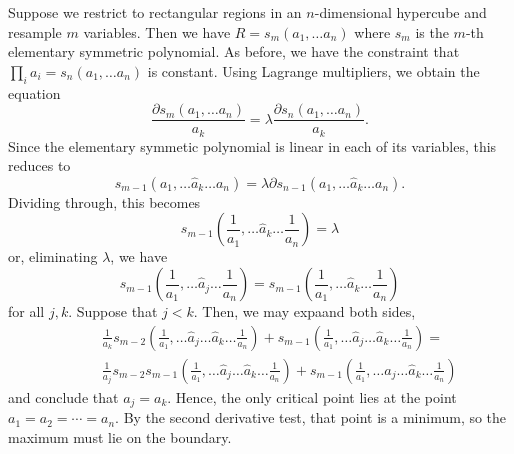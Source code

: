 Suppose we restrict to rectangular regions in an $n$-dimensional hypercube and resample $m$ variables.  Then we have $R = s_m (a_1, \ldots a_n)$ where $s_m$ is the $m$-th elementary symmetric polynomial.  As before, we have the constraint that $\prod_i a_i = s_n (a_1, \ldots a_n)$ is constant.  Using Lagrange multipliers, we obtain the equation
\[
\frac{\partial s_m (a_1, \ldots a_n)}{a_k} = \lambda \frac{\partial s_n (a_1, \ldots a_n)}{a_k} .
\]
Since the elementary symmetic polynomial is linear in each of its variables, this reduces to
\[
s_{m-1} (a_1, \ldots {\hat a}_k \ldots a_n) = \lambda \partial s_{n-1} (a_1, \ldots {\hat a}_k \ldots a_n) .
\]
Dividing through, this becomes
\[
s_{m-1} \left(\frac{1}{a_1}, \ldots {\hat a}_k \ldots \frac{1}{a_n}\right) = \lambda
\]
or, eliminating $\lambda$, we have
\[
s_{m-1} \left(\frac{1}{a_1}, \ldots {\hat a}_j \ldots \frac{1}{a_n}\right) =
s_{m-1} \left(\frac{1}{a_1}, \ldots {\hat a}_k \ldots \frac{1}{a_n}\right)
\]
for all $j,k$.  Suppose that $j < k$.  Then, we may expaand both sides,
\begin{align*}
&\frac{1}{a_k} s_{m-2} \left(\frac{1}{a_1}, \ldots {\hat a}_j \ldots {\hat a}_k \ldots \frac{1}{a_n}\right) +
s_{m-1} \left(\frac{1}{a_1}, \ldots {\hat a}_j \ldots {\hat a}_k \ldots \frac{1}{a_n}\right) = \\ \qquad
&\frac{1}{a_j} s_{m-2} s_{m-1} \left(\frac{1}{a_1}, \ldots {\hat a}_j \ldots {\hat a}_k \ldots \frac{1}{a_n}\right) +
s_{m-1} \left(\frac{1}{a_1}, \ldots {\hat a}_j \ldots {\hat a}_k \ldots \frac{1}{a_n}\right)
\end{align*}
and conclude that $a_j = a_k$.  Hence, the only critical point lies at the point $a_1 = a_2 = \cdots = a_n$.  By the second derivative test, that point is a minimum, so the maximum must lie on the boundary.





